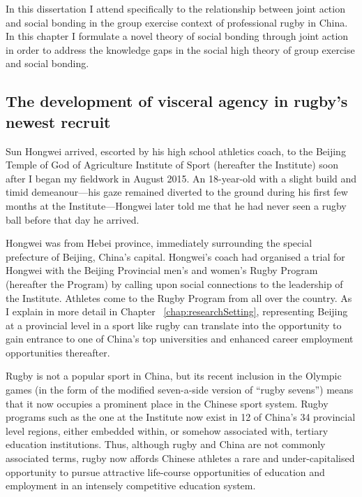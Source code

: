 In this dissertation I attend specifically to the relationship between joint action and social bonding in the group exercise context of professional rugby in China.  In this chapter I formulate a novel theory of social bonding through joint action in order to address the knowledge gaps in the social high theory of group exercise and social bonding.


                                  \begin{CJK}{UTF8}{gbsn}

\section{The development of visceral agency in rugby's newest recruit\label{sect:SHW}}
Sun Hongwei arrived, escorted by his high school athletics coach, to the Beijing Temple of God of Agriculture Institute of Sport (hereafter the Institute) soon after I began my fieldwork in August 2015.  An 18-year-old with a slight build and timid demeanour---his gaze remained diverted to the ground during his first few months at the Institute---Hongwei later told me that he had never seen a rugby ball before that day he arrived.

Hongwei was from Hebei province, immediately surrounding the special prefecture of Beijing, China's capital.  Hongwei's coach had organised a trial for Hongwei with the Beijing Provincial men’s and women's Rugby Program (hereafter the Program) by calling upon social connections to the leadership of the Institute.  Athletes come to the Rugby Program from all over the country.  As I explain in more detail in Chapter ~\ref{chap:researchSetting}, representing Beijing at a provincial level in a sport like rugby can translate into the opportunity to gain entrance to one of China's top universities and enhanced career employment opportunities thereafter.

Rugby is not a popular sport in China, but its recent inclusion in the Olympic games (in the form of the modified seven-a-side version of ``rugby sevens'') means that it now occupies a prominent place in the Chinese sport system.  Rugby programs such as the one at the Institute now exist in 12 of China's 34 provincial level regions, either embedded within, or somehow associated with, tertiary education institutions.  Thus, although rugby and China are not commonly associated terms, rugby now affords Chinese athletes a rare and under-capitalised opportunity to pursue attractive life-course opportunities of education and employment in an intensely competitive education system.


\end{CJK}
